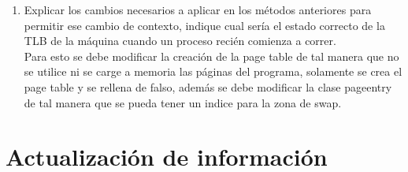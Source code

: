 \documentclass[11pt]{article}
\begin{document}
\begin{enumerate}
\begin{enumerate}
        \item Explicar los cambios necesarios a aplicar en los métodos anteriores para permitir ese cambio de contexto, indique cual sería el estado correcto de la TLB de la máquina cuando un proceso recién comienza a correr.\\
        Para esto se debe modificar la creación de la page table de tal manera que no se utilice ni se carge a memoria las páginas del programa, solamente se crea el page table y se rellena de falso, además se debe modificar la clase pageentry de tal manera que se pueda tener un indice para la zona de swap.
        
      \end{enumerate}
    \end{enumerate}
   \section{Actualización de información}
\end{document}
